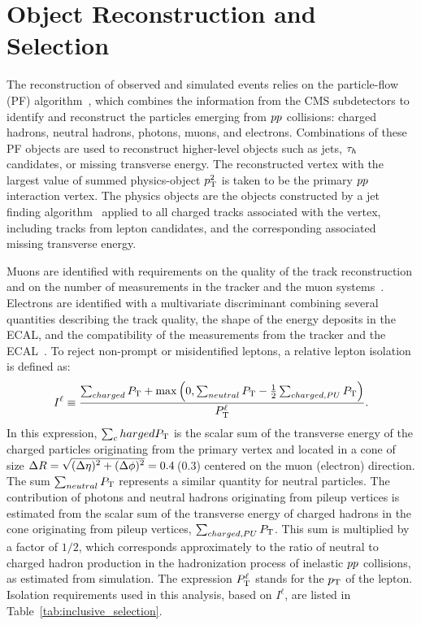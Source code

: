 \chapter{Object Reconstruction and Selection}

The reconstruction of observed and simulated events relies on the particle-flow (PF) algorithm~\cite{Sirunyan:2017ulk},
which combines the information from the CMS subdetectors to identify
and reconstruct the particles emerging from $pp$ collisions:
charged hadrons, neutral hadrons, photons, muons, and electrons.
Combinations of these PF objects are used to reconstruct
higher-level objects such as jets, $\tau_{h}$ candidates, or
missing transverse energy.
The reconstructed vertex with the largest value of summed physics-object $p_\mathrm{T}^2$ is taken to be the primary $pp$ interaction vertex. The physics objects are the objects constructed by a jet finding algorithm~\cite{Cacciari:2008gp,Cacciari:2011ma} applied to all charged tracks associated with the vertex, including tracks from lepton candidates, and the corresponding associated missing transverse energy.

Muons are identified with requirements on the quality of
the track reconstruction and on the number of measurements in the
tracker and the muon systems~\cite{Chatrchyan:2012xi}.
Electrons are identified with a multivariate discriminant
combining several quantities describing the track quality,
the shape of the energy deposits in the ECAL,
and the compatibility of the measurements from the tracker and the
ECAL~\cite{Khachatryan:2015hwa}.
To reject non-prompt or misidentified leptons, a relative lepton isolation is defined as:
\begin{equation}
I^{\ell} \equiv \frac{\sum_{charged}  P_\mathrm{T} + \max\left( 0, \sum_{neutral}  P_\mathrm{T}
                                         - \frac{1}{2} \sum_{charged, PU} P_\mathrm{T}  \right )}{P_\mathrm{T}^{\ell}}.
\label{eq:reconstruction_isolation}
\end{equation}
In this expression, $\sum_charged  P_\mathrm{T}$ is the scalar sum of the
transverse energy of the charged particles originating from
the primary vertex and located in a cone of size
$\Delta R = \sqrt{\smash[b]{(\Delta \eta)^2 + (\Delta \phi)^2}} = 0.4$\,(0.3)
centered on the muon (electron) direction. The sum
$\sum_{neutral}  P_\mathrm{T}$  represents
a similar quantity for neutral particles.
The contribution of photons and neutral hadrons originating from pileup vertices is estimated from the scalar sum of the transverse
energy of charged hadrons in the cone originating from pileup vertices,
$\sum_{charged, PU} P_\mathrm{T}$. This sum is multiplied by a factor of
$1/2$, which corresponds approximately to the ratio of neutral to charged
hadron production in the hadronization process
of inelastic $pp$ collisions, as estimated from simulation.
The expression $P_\mathrm{T}^{\ell}$ stands for the $p_\mathrm{T}$ of the lepton. Isolation requirements used in this analysis, based on $I^{\ell}$, are listed in Table~\ref{tab:inclusive_selection}.

